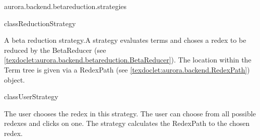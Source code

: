 \begin{texdocpackage}{aurora.backend.betareduction.strategies}
\begin{texdocclass}{class}{ReductionStrategy}
\label{texdoclet:aurora.backend.betareduction.strategies.ReductionStrategy}
\begin{texdocclassintro}
A beta reduction strategy.\texdocbr  A strategy evaluates terms and choses a redex to be reduced by the BetaReducer (see \ref{texdoclet:aurora.backend.betareduction.BetaReducer}).
 The location within the Term tree is given via a RedexPath (see \ref{texdoclet:aurora.backend.RedexPath}) object.\end{texdocclassintro}
\begin{texdocclassconstructors}
\end{texdocclassconstructors}
\begin{texdocclassmethods}
\end{texdocclassmethods}
\end{texdocclass}


\begin{texdocclass}{class}{UserStrategy}
\label{texdoclet:aurora.backend.betareduction.strategies.UserStrategy}
\begin{texdocclassintro}
The user chooses the redex in this strategy.
 The user can choose from all possible redexes and clicks on one.
 The strategy calculates the RedexPath to the chosen redex.\end{texdocclassintro}
\begin{texdocclassconstructors}
\end{texdocclassconstructors}
\begin{texdocclassmethods}
\end{texdocclassmethods}
\end{texdocclass}


\end{texdocpackage}



